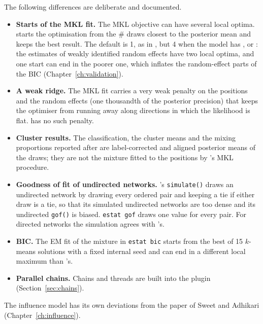 The following differences are deliberate and documented.
\begin{itemize}[nosep]
  \item \textbf{Starts of the MKL fit.} The MKL objective can have several local optima.  starts the optimisation from the \# draws closest to the posterior mean and keeps the best result. The default is 1, as in \latentnet{}, but 4 when the model has ,  or : the estimates of weakly identified random effects have two local optima, and one start can end in the poorer one, which inflates the random-effect parts of the BIC (Chapter~\ref{ch:validation}).
  \item \textbf{A weak ridge.} The MKL fit carries a very weak penalty on the positions and the random effects (one thousandth of the posterior precision) that keeps the optimiser from running away along directions in which the likelihood is flat. \latentnet{} has no such penalty.
  \item \textbf{Cluster results.} The classification, the cluster means and the mixing proportions reported after  are label-corrected and aligned posterior means of the draws; they are not the mixture fitted to the positions by \latentnet{}'s MKL procedure.
  \item \textbf{Goodness of fit of undirected networks.} \latentnet{}'s \texttt{simulate()} draws an undirected network by drawing every ordered pair and keeping a tie if either draw is a tie, so that its simulated undirected networks are too dense and its undirected \texttt{gof()} is biased. \texttt{estat gof} draws one value for every pair. For directed networks the simulation agrees with \latentnet{}'s.
  \item \textbf{BIC.} The EM fit of the mixture in \texttt{estat bic} starts from the best of 15 $k$-means solutions with a fixed internal seed and can end in a different local maximum than \latentnet{}'s.
  \item \textbf{Parallel chains.} Chains and threads are built into the plugin (Section~\ref{sec:chains}).
\end{itemize}
The influence model has its own deviations from the paper of Sweet and Adhikari (Chapter~\ref{ch:influence}).
